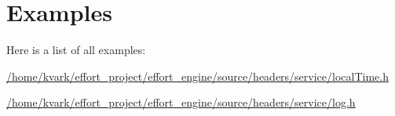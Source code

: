 \section{Examples}
Here is a list of all examples\+:\begin{DoxyCompactItemize}
\item 
\mbox{\hyperlink{_2home_2kvark_2effort_project_2effort_engine_2source_2headers_2service_2localTime_8h-example}{/home/kvark/effort\+\_\+project/effort\+\_\+engine/source/headers/service/local\+Time.\+h}}
\item 
\mbox{\hyperlink{_2home_2kvark_2effort_project_2effort_engine_2source_2headers_2service_2log_8h-example}{/home/kvark/effort\+\_\+project/effort\+\_\+engine/source/headers/service/log.\+h}}
\end{DoxyCompactItemize}
